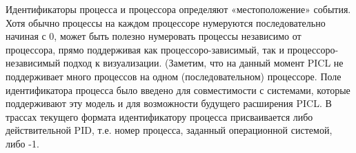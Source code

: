 Идентификаторы процесса и процессора определяют «местоположение» события. Хотя обычно процессы на каждом процессоре нумеруются последовательно начиная с 0, может быть полезно нумеровать процессы независимо от процессора, прямо поддерживая как процессоро-зависимый, так и процессоро-независимый подход к визуализации. (Заметим, что на данный момент PICL не поддерживает много процессов на одном (последовательном) процессоре. Поле идентификатора процесса было введено для совместимости с системами, которые поддерживают эту модель и для возможности будущего расширения PICL. В трассах текущего формата идентификатору процесса присваивается либо действительной PID, т.е. номер процесса, заданный операционной системой, либо -1.

